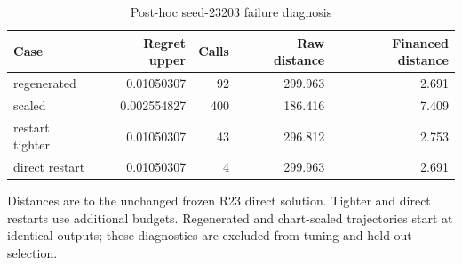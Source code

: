 \begin{table}[htbp]\centering\small
\caption{Post-hoc seed-23203 failure diagnosis}\label{tab:r24failure}
\begin{tabular}{lrrrr}\toprule
Case & Regret upper & Calls & Raw distance & Financed distance\\\midrule
regenerated & 0.01050307 & 92 & 299.963 & 2.691\\
scaled & 0.002554827 & 400 & 186.416 & 7.409\\
restart tighter & 0.01050307 & 43 & 296.812 & 2.753\\
direct restart & 0.01050307 & 4 & 299.963 & 2.691\\
\bottomrule\end{tabular}
\par\smallskip\begin{minipage}{.97\textwidth}\footnotesize Distances are to the unchanged frozen R23 direct solution. Tighter and direct restarts use additional budgets. Regenerated and chart-scaled trajectories start at identical outputs; these diagnostics are excluded from tuning and held-out selection.\end{minipage}
\end{table}
